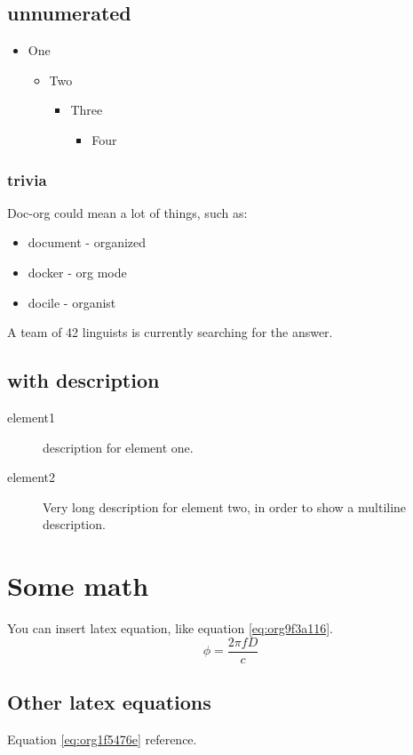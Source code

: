 \subsection{unnumerated}
\label{sec:orgcdaf3d7}
\begin{itemize}
\item One
\begin{itemize}
\item Two
\begin{itemize}
\item Three
\begin{itemize}
\item Four
\end{itemize}
\end{itemize}
\end{itemize}
\end{itemize}

\subsubsection{trivia}
\label{sec:org77a5be3}
Doc-org could mean a lot of things, such as:
\begin{itemize}
\item document - organized
\item docker - org mode
\item docile - organist
\end{itemize}
A team of 42 linguists is currently searching for the answer.
\subsection{with description}
\label{sec:org8af2cc0}
\begin{description}
\item[{element1}] description for element one.
\item[{element2}] Very long description for element two, in order to show a
multiline description.
\end{description}

\section{Some math}
\label{sec:org20ec65f}
You can insert latex equation, like equation \ref{eq:org9f3a116}.
\begin{equation}
\label{eq:org9f3a116}
\phi = \frac{2\pi fD}{c}
\end{equation}
\subsection{Other latex equations}
\label{sec:org7a9e077}
Equation \ref{eq:org1f5476e} reference.

